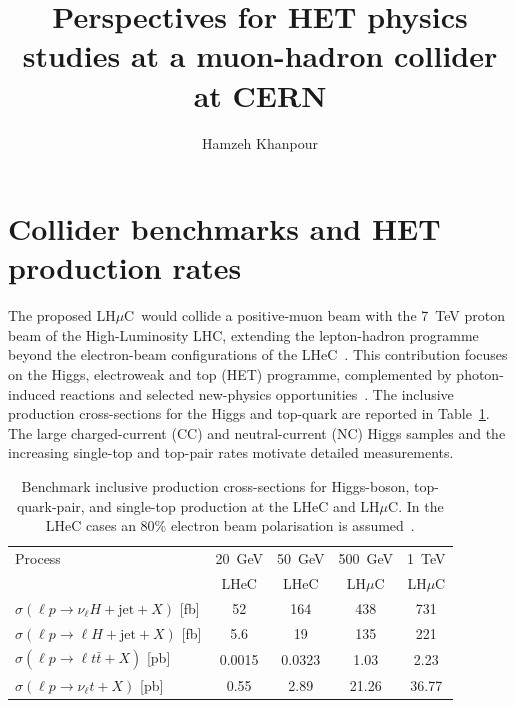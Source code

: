 \documentclass[a4paper,11pt]{article}
\title{Perspectives for HET physics studies at a muon-hadron collider at CERN}
\author*[a]{Hamzeh Khanpour}
\affiliation[a]{AGH University of Krakow, Faculty of Physics and Applied Computer Science,
Al. Mickiewicza 30, 30-055 Krak\'ow, Poland.}
\newcommand{\lhmuc}{LH$\mu$C}
\begin{document}
\maketitle



\section{Collider benchmarks and HET production rates}\label{sec:setup}


The proposed \lhmuc\ would collide a positive-muon beam with the 7~TeV proton beam of the 
High-Luminosity LHC, extending the lepton-hadron programme beyond the electron-beam 
configurations of the LHeC~\cite{Akturk:2025ubm,LHeC:2020van,Ahmadova:2025vzd}. This contribution focuses on 
the Higgs, electroweak and top (HET) programme, complemented by photon-induced reactions and 
selected new-physics opportunities~\cite{Khanpour:DIS2026,HELP4CERN}. 
The inclusive production cross-sections for the Higgs and top-quark are reported in Table~\ref{tab:rates}. 
The large charged-current (CC) and neutral-current (NC) Higgs samples and the increasing single-top and top-pair 
rates motivate detailed measurements.  

\begin{table}[htbp]
\centering
\small
\setlength{\tabcolsep}{6pt}
\renewcommand{\arraystretch}{1.18}
\begin{tabular}{lcccc}
\toprule
Process & 20~GeV & 50~GeV & 500~GeV & 1~TeV\\
& LHeC   & LHeC   & \lhmuc  & \lhmuc\\
\midrule
$\sigma(\ell p\to\nu_\ell H+\mathrm{jet}+X)$ [fb]
& 52 & 164 & 438 & 731 \\
		
$\sigma(\ell p\to\ell H+\mathrm{jet}+X)$ [fb]
& 5.6 & 19 & 135 & 221 \\
		
$\sigma(\ell p\to\ell t\bar t+X)$ [pb]
& 0.0015 & 0.0323 & 1.03 & 2.23 \\
		
$\sigma(\ell p\to\nu_\ell t+X)$ [pb]
& 0.55 & 2.89 & 21.26 & 36.77 \\
\bottomrule
\end{tabular}
\caption{Benchmark inclusive production cross-sections for
Higgs-boson, top-quark-pair, and single-top production at the
LHeC and \lhmuc. 
In the LHeC cases an 80\% electron beam polarisation is assumed~\cite{Andre:2025iar}.}
\label{tab:rates}
\end{table}
\end{document}
